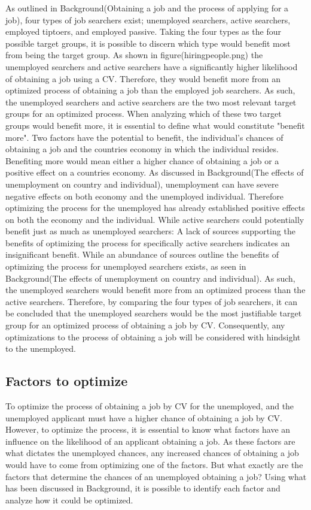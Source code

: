 As outlined in Background(Obtaining a job and the process of applying for a job), four types of job searchers exist; unemployed searchers, active searchers, employed tiptoers, and employed passive.
Taking the four types as the four possible target groups, it is possible to discern which type would benefit most from being the target group.
As shown in figure(hiringpeople.png) the unemployed searchers and active searchers have a significantly higher likelihood of obtaining a job using a CV.
Therefore, they would benefit more from an optimized process of obtaining a job than the employed job searchers.
As such, the unemployed searchers and active searchers are the two most relevant target groups for an optimized process.
When analyzing which of these two target groups would benefit more, it is essential to define what would constitute "benefit more".
Two factors have the potential to benefit, the individual's chances of obtaining a job and the countries economy in which the individual resides.
Benefiting more would mean either a higher chance of obtaining a job or a positive effect on a countries economy.
As discussed in Background(The effects of unemployment on country and individual), unemployment can have severe negative effects on both economy and the unemployed individual.
Therefore optimizing the process for the unemployed has already established positive effects on both the economy and the individual.
While active searchers could potentially benefit just as much as unemployed searchers:
A lack of sources supporting the benefits of optimizing the process for specifically active searchers indicates an insignificant benefit.
While an abundance of sources outline the benefits of optimizing the process for unemployed searchers exists, as seen in Background(The effects of unemployment on country and individual).
As such, the unemployed searchers would benefit more from an optimized process than the active searchers.
Therefore, by comparing the four types of job searchers, it can be concluded that the unemployed searchers would be the most justifiable target group for an optimized process of obtaining a job by CV.
Consequently, any optimizations to the process of obtaining a job will be considered with hindsight to the unemployed. \\
 
\subsection{Factors to optimize}
To optimize the process of obtaining a job by CV for the unemployed, and the unemployed applicant must have a higher chance of obtaining a job by CV.
However, to optimize the process, it is essential to know what factors have an influence on the likelihood of an applicant obtaining a job.
As these factors are what dictates the unemployed chances, any increased chances of obtaining a job would have to come from optimizing one of the factors.
But what exactly are the factors that determine the chances of an unemployed obtaining a job?
Using what has been discussed in Background, it is possible to identify each factor and analyze how it could be optimized. \\


